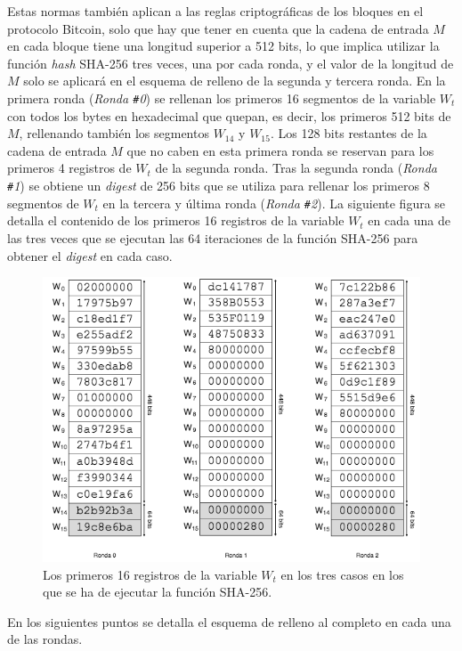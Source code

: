 \documentclass{article}
\begin{document}
    Estas normas también aplican a las reglas criptográficas de los bloques en el protocolo Bitcoin, solo que hay que tener en cuenta que la cadena de entrada $M$ en cada bloque tiene una longitud superior a 512 bits, lo que implica utilizar la función \textit{hash} SHA-256 tres veces, una por cada ronda, y el valor de la longitud de $M$ solo se aplicará en el esquema de relleno de la segunda y tercera ronda. En la primera ronda (\textit{Ronda \texttt{\#}0}) se rellenan los primeros 16 segmentos de la variable $W_t$ con todos los bytes en hexadecimal que quepan, es decir, los primeros 512 bits de $M$, rellenando también los segmentos $W_{14}$ y $W_{15}$. Los 128 bits restantes de la cadena de entrada $M$ que no caben en esta primera ronda se reservan para los primeros 4 registros de $W_t$ de la segunda ronda. Tras la segunda ronda (\textit{Ronda \texttt{\#}1}) se obtiene un \textit{digest} de 256 bits que se utiliza para rellenar los primeros 8 segmentos de $W_t$ en la tercera y última ronda (\textit{Ronda \texttt{\#}2}). La siguiente figura se detalla el contenido de los primeros 16 registros de la variable $W_{t}$ en cada una de las tres veces que se ejecutan las 64 iteraciones de la función SHA-256 para obtener el \textit{digest} en cada caso.
    \begin{figure}[H]
    \centering
        \includegraphics[scale=0.59]{img/Bitcoin_block_SHA_256_W0_W15_x3}
        \caption{Los primeros 16 registros de la variable $W_{t}$ en los tres casos en los que se ha de ejecutar la función SHA-256.}
    \end{figure}
    
    En los siguientes puntos se detalla el esquema de relleno al completo en cada una de las rondas.
    
\end{document}
